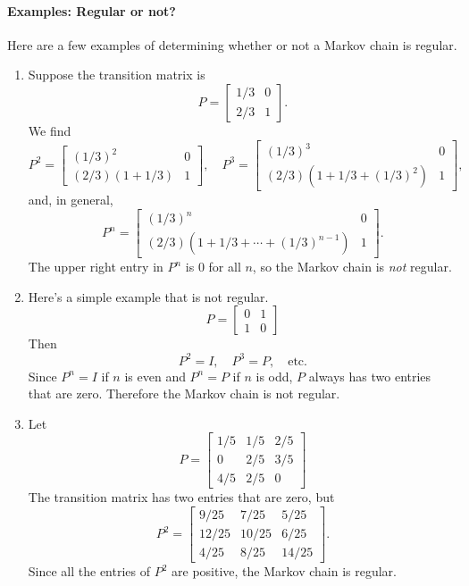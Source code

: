 \documentclass[reqno]{immbook}
\begin{document}
\paragraph{Examples: Regular or not?}
Here are a few examples of determining whether or not a
Markov chain is regular.
\begin{enumerate}
\item Suppose the transition matrix is
\begin{equation}
  P = \begin{bmatrix} 1/3 & 0 \\ 2/3 & 1 \end{bmatrix}.
\end{equation}
We find
\begin{equation}
 P^2 = \begin{bmatrix} (1/3)^2 & 0 \\ (2/3)(1+1/3) & 1 \end{bmatrix},
 \quad
 P^3 = \begin{bmatrix} (1/3)^3 & 0 \\ (2/3)(1+1/3+(1/3)^2) & 1 \end{bmatrix},
\end{equation}
and, in general,
\begin{equation}
 P^n = \begin{bmatrix} (1/3)^n & 0 \\ (2/3)(1+1/3+\cdots+(1/3)^{n-1}) & 1 \end{bmatrix}.
\end{equation}
The upper right entry in $P^n$ is $0$ for all $n$, so the Markov chain
is \emph{not} regular.
\item Here's a simple example that is not regular.
\begin{equation}
   P = \begin{bmatrix} 0 & 1 \\ 1 & 0 \end{bmatrix}
\end{equation}
Then
\begin{equation}
   P^2 = I, \quad P^3 = P, \quad \textrm{etc.}
\end{equation}
Since $P^n=I$ if $n$ is even and $P^n=P$ if $n$ is odd, $P$
always has two entries that are zero.  Therefore the Markov
chain is not regular.
\item
Let
\begin{equation}
  P = \begin{bmatrix}
           1/5 & 1/5 & 2/5 \\
	   0   & 2/5 & 3/5 \\
	   4/5 & 2/5 & 0
      \end{bmatrix}
\end{equation}
The transition matrix has two entries that are zero, but
\begin{equation}
  P^2 = \begin{bmatrix}
           9/25 & 7/25 & 5/25 \\
	   12/25 & 10/25 & 6/25 \\
	   4/25 & 8/25 & 14/25
        \end{bmatrix}.
\end{equation}
Since all the entries of $P^2$ are positive, the Markov chain
is regular.
\end{enumerate}
%
%
%
\end{document}
